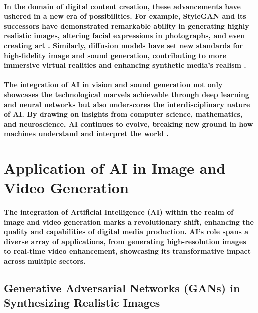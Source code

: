 \documentclass[11pt,a4paper,oneside]{report}
\begin{document}
\paragraph{In the domain of digital content creation, these advancements have ushered in a new era of possibilities. For example, StyleGAN and its successors have demonstrated remarkable ability in generating highly realistic images, altering facial expressions in photographs, and even creating art \cite{patashnik2021styleclip}. Similarly, diffusion models have set new standards for high-fidelity image and sound generation, contributing to more immersive virtual realities and enhancing synthetic media's realism \cite{rombach2022high}.
}

\paragraph{The integration of AI in vision and sound generation not only showcases the technological marvels achievable through deep learning and neural networks but also underscores the interdisciplinary nature of AI. By drawing on insights from computer science, mathematics, and neuroscience, AI continues to evolve, breaking new ground in how machines understand and interpret the world \cite{silver2016mastering}.
}

\section{Application of AI in Image and Video Generation}
\paragraph{The integration of Artificial Intelligence (AI) within the realm of image and video generation marks a revolutionary shift, enhancing the quality and capabilities of digital media production. AI's role spans a diverse array of applications, from generating high-resolution images to real-time video enhancement, showcasing its transformative impact across multiple sectors.
}
\subsection{Generative Adversarial Networks (GANs) in Synthesizing Realistic Images}
\end{document}
